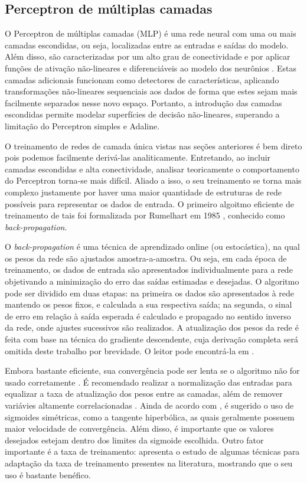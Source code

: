 \documentclass[conference]{IEEEtran}
\begin{document}
	\subsection{Perceptron de múltiplas camadas}
	
	O Perceptron de múltiplas camadas (MLP) é uma rede neural com uma ou mais camadas escondidas, ou seja, localizadas entre as entradas e saídas do modelo. Além disso, são caracterizadas por um alto grau de conectividade e por aplicar funções de ativação não-lineares e diferenciáveis ao modelo dos neurônios \cite{haykin2007neural}. Estas camadas adicionais funcionam como detectores de características, aplicando transformações não-lineares sequenciais aos dados de forma que estes sejam mais facilmente separados nesse novo espaço. Portanto, a introdução das camadas escondidas permite modelar superfícies de decisão não-lineares, superando a limitação do Perceptron simples e Adaline.
	
	O treinamento de redes de camada única vistas nas seções anteriores é bem direto pois podemos facilmente derivá-las analiticamente. Entretando, ao incluir camadas escondidas e alta conectividade, analisar teoricamente o comportamento do Perceptron torna-se mais difícil. Aliado a isso, o seu treinamento se torna mais complexo justamente por haver uma maior quantidade de estruturas de rede possíveis para representar os dados de entrada. O primeiro algoitmo eficiente de treinamento de tais foi formalizada por Rumelhart em 1985 \cite{rumelhart1985learning}, conhecido como \textit{back-propagation}.    
	
	O \textit{back-propagation} é uma técnica de aprendizado online (ou estocástica), na qual os pesos da rede são ajustados amostra-a-amostra. Ou seja, em cada época de treinamento, os dados de entrada são apresentados individualmente para a rede objetivando a minimização do erro das saídas estimadas e desejadas. O algoritmo pode ser dividido em duas etapas: na primeira os dados são apresentados à rede mantendo os pesos fixos, e calculada a sua respectiva saída; na segunda, o sinal de erro em relação à saída esperada é calculado e propagado no sentido inverso da rede, onde ajustes sucessivos são realizados. A atualização dos pesos da rede é feita com base na técnica do gradiente descendente, cuja derivação completa será omitida deste trabalho por brevidade. O leitor pode encontrá-la em \cite{rumelhart1985learning, haykin2007neural}. 
	
	Embora bastante eficiente, sua convergência pode ser lenta se o algoritmo não for usado corretamente \cite{lecun1993efficient}. É recomendado realizar a normalização das entradas para equalizar a taxa de atualização dos pesos entre as camadas, além de remover variávies altamente correlacionadas \cite{lecun2012efficient}. Ainda de acordo com \cite{lecun2012efficient}, é sugerido o uso de sigmoides simétricas, como a tangente hiperbólica, as quais geralmente possuem maior velocidade de convergência. Além disso, é importante que os valores desejados estejam dentro dos limites da sigmoide escolhida. Outro fator importante é a taxa de treinamento: \cite{magoulas1999improving} apresenta o estudo de algumas técnicas para adaptação da taxa de treinamento presentes na literatura, mostrando que o seu uso é bastante benéfico. 
	
\end{document}
